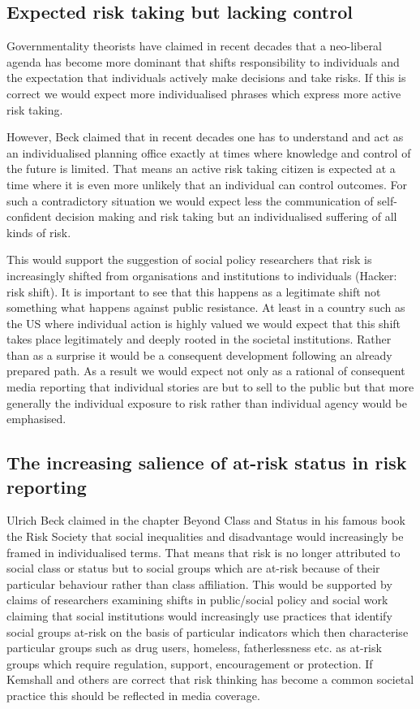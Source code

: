 \subsection*{Expected risk taking but lacking control}

Governmentality theorists have claimed in recent decades that a neo-liberal agenda has become more dominant that shifts responsibility to individuals and the expectation that individuals actively make decisions and take risks. If this is correct we would expect more individualised phrases which express more active risk taking. 

However, Beck claimed that in recent decades one has to understand and act as an individualised planning office exactly at times where knowledge and control of the future is limited. That means an active risk taking citizen is expected at a time where it is even more unlikely that an individual can control outcomes. For such a contradictory situation we would expect less the communication of self-confident decision making and risk taking but an individualised suffering of all kinds of risk. 

This would support the suggestion of social policy researchers that risk is increasingly shifted from organisations and institutions to individuals (Hacker: risk shift). It is important to see that this happens as a legitimate shift not something what happens against public resistance. At least in a country such as the US where individual action is highly valued we would expect that this shift takes place legitimately and deeply rooted in the societal institutions. Rather than as a surprise it would be a consequent development following an already prepared path. As a result we would expect not only as a rational of consequent media reporting that individual stories are but to sell to the public but that more generally the individual exposure to risk rather than individual agency would be emphasised. 

\subsection*{The increasing salience of at-risk status in risk reporting}

Ulrich Beck claimed in the chapter Beyond Class and Status in his famous book the Risk Society that social inequalities and disadvantage would increasingly be framed in individualised terms. That means that risk is no longer attributed to social class or status but to social groups which are at-risk because of their particular behaviour rather than class affiliation. 
This would be supported by claims of researchers examining shifts in public\slash social policy and social work claiming that social institutions would increasingly use practices that identify social groups at-risk on the basis of particular indicators which then characterise particular groups such as drug users, homeless, fatherlessness etc. as at-risk groups which require regulation, support, encouragement or protection. If Kemshall and others are correct that risk thinking has become a common societal practice this should be reflected in media coverage.

